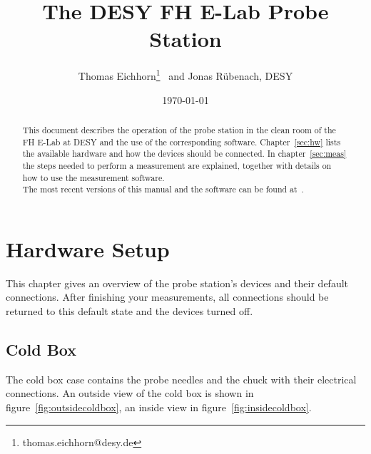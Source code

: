 \documentclass[a4paper]{article}
\begin{document}
\author{Thomas Eichhorn\footnote{thomas.eichhorn@desy.de}~ and Jonas R\"ubenach, DESY}
\date{\today}
\title{The DESY FH E-Lab Probe Station}
\maketitle
\begin{abstract}
This document describes the operation of the probe station in the clean room of the FH E-Lab at DESY and the use of the corresponding software.
Chapter~\ref{sec:hw} lists the available hardware and how the devices should be connected.
In chapter~\ref{sec:meas} the steps needed to perform a measurement are explained, together with details on how to use the measurement software.\\ \newline
The most recent versions of this manual and the software can be found at~\cite{ref:github}.
\end{abstract}

\tableofcontents

\newpage
\section{Hardware Setup}
\label{sec:hw}

This chapter gives an overview of the probe station's devices and their default connections.
After finishing your measurements, all connections should be returned to this default state and the devices turned off.\\

\subsection{Cold Box}
\label{sec:coldbox}

The cold box case contains the probe needles and the chuck with their electrical connections.
An outside view of the cold box is shown in figure~\ref{fig:outsidecoldbox}, an inside view in figure~\ref{fig:insidecoldbox}.\\
\end{document}
